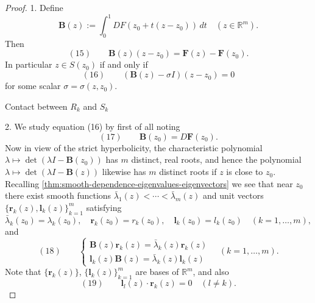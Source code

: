 \begin{proof}
1. Define
$$\mathbf{B}(z) := \int_0^1 DF(z_0+t(z-z_0))\,dt \quad (z\in\mathbb{R}^m).$$
Then
$$(15) \qquad \mathbf{B}(z)(z-z_0) = \mathbf{F}(z) - \mathbf{F}(z_0).$$
In particular $z\in S(z_0)$ if and only if
$$(16) \qquad (\mathbf{B}(z)-\sigma I)(z-z_0) = 0$$
for some scalar $\sigma = \sigma(z,z_0)$.

\begin{figure}[h]\centering
\end{figure}

Contact between $R_k$ and $S_k$

2. We study equation (16) by first of all noting
$$(17) \qquad \mathbf{B}(z_0) = D\mathbf{F}(z_0).$$
Now in view of the strict hyperbolicity, the characteristic polynomial $\lambda \mapsto \det(\lambda I - \mathbf{B}(z_0))$ has $m$ distinct, real roots, and hence the polynomial $\lambda \mapsto \det(\lambda I - \mathbf{B}(z))$ likewise has $m$ distinct roots if $z$ is close to $z_0$. Recalling \cref{thm:smooth-dependence-eigenvalues-eigenvectors} we see that near $z_0$ there exist smooth functions $\bar\lambda_1(z) < \cdots < \bar\lambda_m(z)$ and unit vectors $\{\mathbf{r}_k(z), \mathbf{l}_k(z)\}_{k=1}^m$ satisfying
$$\bar\lambda_k(z_0) = \lambda_k(z_0), \quad \mathbf{r}_k(z_0) = r_k(z_0), \quad \mathbf{l}_k(z_0) = l_k(z_0) \quad (k=1,\ldots,m),$$
and
$$(18) \qquad \begin{cases} \mathbf{B}(z)\mathbf{r}_k(z) = \bar\lambda_k(z)\mathbf{r}_k(z) \\ \mathbf{l}_k(z)\mathbf{B}(z) = \bar\lambda_k(z)\mathbf{l}_k(z) \end{cases} \quad (k=1,\ldots,m).$$
Note that $\{\mathbf{r}_k(z)\}$, $\{\mathbf{l}_k(z)\}_{k=1}^m$ are bases of $\mathbb{R}^m$, and also
$$(19) \qquad \mathbf{l}_l(z)\cdot\mathbf{r}_k(z) = 0 \quad (l\neq k).$$


\end{proof}
